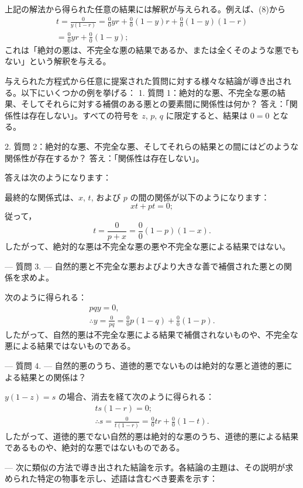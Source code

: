 \documentclass[a4paper,11pt,openany]{ltjsbook}
\begin{document}
上記の解法から得られた任意の結果には解釈が与えられる。例えば、(8)から
\begin{multline*}
  t = \frac{0}{y(1-r)} = \frac{0}{0}yr
    + \frac{0}{0}(1-y)r + \frac{0}{0}(1-y)(1-r)   \\
  = \frac{0}{0}yr + \frac{0}{0}(1-y);
\end{multline*}
これは「絶対の悪は、不完全な悪の結果であるか、または全くそのような悪でもない」という解釈を与える。

与えられた方程式から任意に提案された質問に対する様々な結論が導き出される。以下にいくつかの例を挙げる：
1. 質問 1：絶対的な悪、不完全な悪の結果、そしてそれらに対する補償のある悪との要素間に関係性は何か？
答え：「関係性は存在しない」。すべての符号を $z$, $p$, $q$ に限定すると、結果は $0 = 0$ となる。

2. 質問 2：絶対的な悪、不完全な悪、そしてそれらの結果との間にはどのような関係性が存在するか？
答え：「関係性は存在しない」。

答えは次のようになります：

最終的な関係式は、$x$, $t$, および $p$ の間の関係が以下のようになります：
\[
xt + pt = 0;
\]
従って，
\[
t = \frac{0}{p + x} = \frac{0}{0}(1 - p)(1 - x).
\]
したがって、絶対的な悪は不完全な悪の悪や不完全な悪による結果ではない。

---
質問 3. --- 自然的悪と不完全な悪およびより大きな善で補償された悪との関係を求めよ。

次のように得られる：
\begin{gather*}
pqy = 0, \\
\therefore y = \frac{0}{pq} = \frac{0}{0}p(1 - q) + \frac{0}{0}(1 - p).
\end{gather*}
したがって、自然的悪は不完全な悪による結果で補償されないものや、不完全な悪による結果ではないものである。

---
質問 4. --- 自然的悪のうち、道徳的悪でないものは絶対的な悪と道徳的悪による結果との関係は？

$y(1 - z) = s$ の場合、消去を経て次のように得られる：
\begin{gather*}
ts(1 - r) = 0; \\
\therefore s = \frac{0}{t(1 - r)} = \frac{0}{0}tr + \frac{0}{0}(1 - t).
\end{gather*}
したがって、道徳的悪でない自然的悪は絶対的な悪のうち、道徳的悪による結果であるものや、絶対的な悪ではないものである。

---
次に類似の方法で導き出された結論を示す。各結論の主題は、その説明が求められた特定の物事を示し、述語は含むべき要素を示す：
\end{document}
